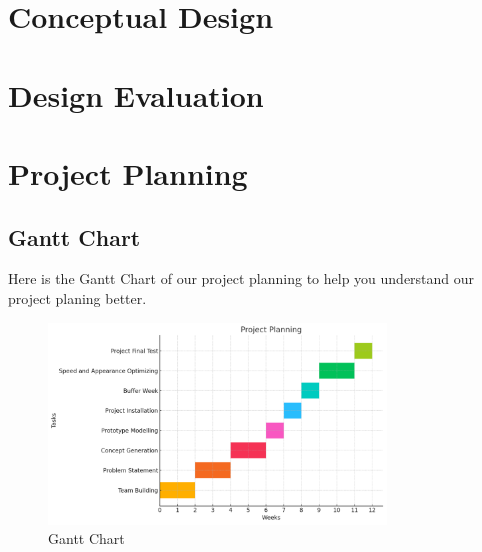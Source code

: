\documentclass[12pt]{article}
\begin{document}
\section{Conceptual Design}
\section{Design Evaluation}

\section{Project Planning}
\subsection{Gantt Chart}
Here is the Gantt Chart of our project planning to help you understand our project planing better. 
\begin{figure}[h] 
    \centering 
    \includegraphics[width=0.8\textwidth]{figure/Picture1.png} 
    \caption{Gantt Chart} 
\end{figure}
\end{document}
